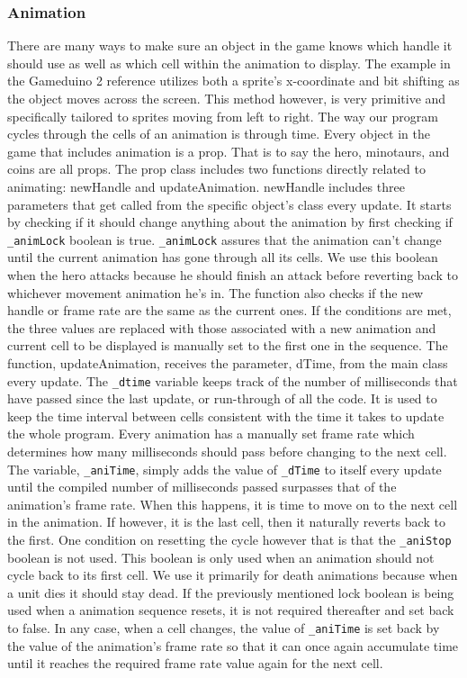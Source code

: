 \newpage
\subsubsection*{Animation}
There are many ways to make sure an object in the game knows which handle it should use as well as which cell within the animation to display. The example in the Gameduino 2 reference utilizes both a sprite's x-coordinate and bit shifting as the object moves across the screen. This method however, is very primitive and specifically tailored to sprites moving from left to right. The way our program cycles through the cells of an animation is through time. \newline
Every object in the game that includes animation is a prop. That is to say the hero, minotaurs, and coins are all props. The prop class includes two functions directly related to animating: newHandle and updateAnimation. newHandle includes three parameters that get called from the specific object's class every update. It starts by checking if it should change anything about the animation by first checking if {\tt \_animLock} boolean is true. {\tt \_animLock} assures that the animation can't change until the current animation has gone through all its cells. We use this boolean when the hero attacks because he should finish an attack before reverting back to whichever movement animation he's in. The function also checks if the new handle or frame rate are the same as the current ones. If the conditions are met, the three values are replaced with those associated with a new animation and current cell to be displayed is manually set to the first one in the sequence.\newline
The function, updateAnimation, receives the parameter, dTime, from the main class every update. The {\tt \_dtime} variable keeps track of the number of milliseconds that have passed since the last update, or run-through of all the code. It is used to keep the time interval between cells consistent with the time it takes to update the whole program. Every animation has a manually set frame rate which determines how many milliseconds should pass before changing to the next cell. The variable, {\tt \_aniTime}, simply adds the value of {\tt \_dTime} to itself every update until the compiled number of milliseconds passed surpasses that of the animation's frame rate. When this happens, it is time to move on to the next cell in the animation. If however, it is the last cell, then it naturally reverts back to the first. One condition on resetting the cycle however that is that the {\tt \_aniStop} boolean is not used. This boolean is only used when an animation should not cycle back to its first cell. We use it primarily for death animations because when a unit dies it should stay dead. If the previously mentioned lock boolean is being used when a animation sequence resets, it is not required thereafter and set back to false. In any case, when a cell changes, the value of {\tt\_aniTime} is set back by the value of the animation’s frame rate so that it can once again accumulate time until it reaches the required frame rate value again for the next cell.

